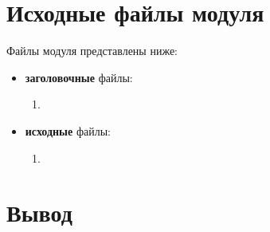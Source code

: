 \section{Исходные файлы модуля }

Файлы модуля представлены ниже:

\begin{itemize}[label=---]
    \item \textbf{заголовочные} файлы:
    \begin{enumerate}[label=\arabic*), labelsep=0.5em]
        \item 
    \end{enumerate}
    \item \textbf{исходные} файлы:
    \begin{enumerate}[label=\arabic*), labelsep=0.5em]
        \item 
    \end{enumerate}
\end{itemize}

\section*{Вывод}